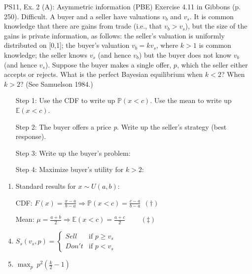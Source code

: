 \begin{frame}{PS11, Ex. 2 (A): Asymmetric information (PBE)}
    Exercise 4.11 in Gibbons (p. 250). Difficult. A buyer and a seller have valuations $v_b$ and $v_s$. It is common knowledge that there are gains from trade (i.e., that $v_b > v_s$), but the size of the gains is private information, as follows: the seller’s valuation is uniformly distributed on [0,1]; the buyer’s valuation $v_b = kv_s$, where $k > 1$ is common knowledge; the seller knows $v_s$ (and hence $v_b$) but the buyer does not know $v_b$ (and hence $v_s$). Suppose the buyer makes a single offer, $p$, which the seller either accepts or rejects. What is the perfect Bayesian equilibrium when $k < 2$? When $k > 2$? (See Samuelson 1984.) \vspace{-8pt}
    \begin{multicols}{2}
      \begin{itemize}
        \item[Step 1:] Use the CDF to write up $\mathbb{P}(x<c)$. Use the mean to write up $\mathbb{E}(x<c)$.
        \item[Step 2:] The buyer offers a price \textit{p}. Write up the seller's strategy (best response).
        \item[Step 3:] Write up the buyer's problem:
        \item[Step 4:] Maximize buyer's utility for $k>2$:
      \end{itemize} \vspace{-8pt}
      \vfill\null\columnbreak
      \begin{enumerate}
        \item Standard results for $x\sim U(a, b):$
        \item[CDF:] $F(x)=\frac{x-a}{b-a}\Rightarrow\mathbb{P}(x<c)=\frac{c-a}{b-a}\ \ (\dagger)$
        \item[Mean:] $\mu=\frac{a+b}{2}\Rightarrow\mathbb{E}(x<c)=\frac{a+c}{2}\quad\quad\ (\ddagger)$
        \item $S_s(v_s,p)=\left\{\begin{array}{ll}
          Sell  & \text{if }p\geq v_s \\
          Don't & \text{if }p < v_s
        \end{array}\right.$
        \item $\displaystyle{\max_p}\ p^2\left(\frac{k}{2}-1\right)$
      \end{enumerate}
      \vfill\null
    \end{multicols}
\end{frame}
